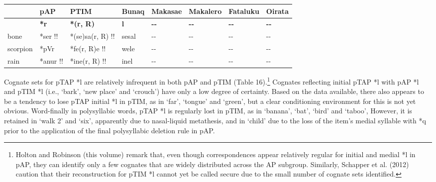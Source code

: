 \begin{center}
\tablehead{}
\begin{supertabular}{m{0.76435983in}m{0.6615598in}m{0.88725984in}m{0.6497598in}m{0.7698598in}m{0.7698598in}m{0.7698598in}m{0.77335984in}}
\hline
 &
pAP &
PTIM &
Bunaq &
Makasae &
Makalero &
Fataluku &
Oirata\\\hline
 &
\textbf{*r} &
\textbf{*(r, R)} &
\textbf{l} &
\textbf{{}-{}-} &
\textbf{{}-{}-} &
\textbf{{}-{}-} &
\textbf{{}-{}-}\\\hline
bone &
*ser !! &
*(se)sa(r, R) !! &
sesal &
{}-{}- &
{}-{}- &
{}-{}- &
{}-{}-\\
scorpion &
*pVr &
*fe(r, R)e !! &
wele &
{}-{}- &
{}-{}- &
{}-{}- &
{}-{}-\\
rain &
*anur !! &
*ine(r, R) !! &
inel &
{}-{}- &
{}-{}- &
{}-{}- &
{}-{}-\\\hline
\end{supertabular}
\end{center}
Cognate sets for pTAP *l are relatively infrequent in both pAP and pTIM (Table 16).\footnote{ Holton and Robinson (this volume) remark that, even though correspondences appear relatively regular for initial and medial *l in pAP, they can identify only a few cognates that are widely distributed across the AP subgroup. Similarly, Schapper et al. (2012) caution that their reconstruction for pTIM *l cannot yet be called secure due to the small number of cognate sets identified.} Cognates reflecting initial pTAP *l with pAP *l and pTIM *l (i.e., {\textquoteleft}bark{\textquoteright}, {\textquoteleft}new place{\textquoteright} and {\textquoteleft}crouch{\textquoteright}) have only a low degree of certainty. Based on the data available, there also appears to be a tendency to lose pTAP initial *l in pTIM, as in {\textquoteleft}far{\textquoteright}, {\textquoteleft}tongue{\textquoteright} and {\textquoteleft}green{\textquoteright}, but a clear conditioning environment for this is not yet obvious. Word-finally in 
polysyllabic words, pTAP *l is regularly lost in pTIM, as in {\textquoteleft}banana{\textquoteright}, {\textquoteleft}bat{\textquoteright}, {\textquoteleft}bird{\textquoteright} and {\textquoteleft}taboo{\textquoteright}, However, it is retained in {\textquoteleft}walk 2{\textquoteright} and {\textquoteleft}six{\textquoteright}, apparently due to nasal-liquid metathesis, and in {\textquoteleft}child{\textquoteright} due to the loss of the item{\textquoteright}s medial syllable with *q prior to the application of the final polysyllabic deletion rule in pAP.

